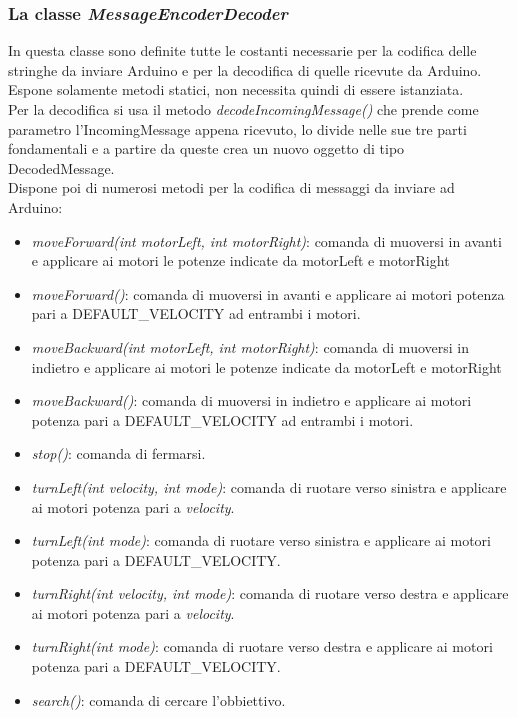 \subsubsection{La classe \emph{MessageEncoderDecoder}}
In questa classe sono definite tutte le costanti necessarie per la codifica delle
stringhe da inviare Arduino e per la decodifica di quelle ricevute da Arduino. 
Espone solamente metodi statici, non necessita quindi di essere istanziata.\\
Per la decodifica si usa il metodo \emph{decodeIncomingMessage()} che prende 
come parametro l'IncomingMessage appena ricevuto, lo divide nelle sue tre parti 
fondamentali e a partire da queste crea un nuovo oggetto di tipo DecodedMessage.\\
Dispone poi di numerosi metodi per la codifica di messaggi da inviare ad Arduino:
\begin{itemize}
    \item \emph{moveForward(int motorLeft, int motorRight)}: comanda di 
    muoversi in avanti e applicare ai motori le potenze indicate da motorLeft e motorRight
    \item \emph{moveForward()}: comanda di muoversi in avanti e applicare ai motori 
    potenza pari a DEFAULT\_VELOCITY ad entrambi i motori. 
    \item \emph{moveBackward(int motorLeft, int motorRight)}: comanda di 
    muoversi in indietro e applicare ai motori le potenze indicate da motorLeft e motorRight
    \item \emph{moveBackward()}: comanda di muoversi in indietro e applicare ai motori 
    potenza pari a DEFAULT\_VELOCITY ad entrambi i motori. 
    \item \emph{stop()}: comanda di fermarsi.
    \item \emph{turnLeft(int velocity, int mode)}: comanda di ruotare verso 
    sinistra e applicare ai motori potenza pari a \emph{velocity}.
    \item \emph{turnLeft(int mode)}: comanda di ruotare verso 
    sinistra e applicare ai motori potenza pari a DEFAULT\_VELOCITY.   
    \item \emph{turnRight(int velocity, int mode)}: comanda di ruotare verso 
    destra e applicare ai motori potenza pari a \emph{velocity}.
    \item \emph{turnRight(int mode)}: comanda di ruotare verso 
    destra e applicare ai motori potenza pari a DEFAULT\_VELOCITY.  
    \item \emph{search()}: comanda di cercare l'obbiettivo.
\end{itemize}
